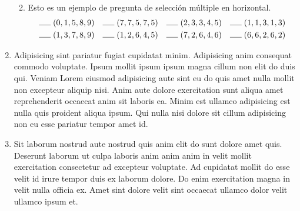 \documentclass[12pt]{article}
\newcommand{\linetomark}{\rule{0.5cm}{0.4pt}  \hspace{1mm}}
\begin{document}
\begin{enumerate}[label=\arabic*)]
\begin{enumerate}[label=1.\arabic*)]
\begin{enumerate}[label=\alph*.]
        \end{enumerate}
        \item Esto es un ejemplo de pregunta de selección múltiple en horizontal.
        \begin{align*}
            \linetomark (0,1,5,8,9) &&\linetomark (7,7,5,7,5) && \linetomark (2,3,3,4,5) && \linetomark (1,1,3,1,3)\\
            \linetomark (1,3,7,8,9) && \linetomark (1,2,6,4,5) && \linetomark (7,2,6,4, 6) &&\linetomark (6,6,2,6,2)
        \end{align*}
    \end{enumerate}
    \item Adipisicing sint pariatur fugiat cupidatat minim. Adipisicing anim consequat commodo voluptate. Ipsum mollit ipsum ipsum magna cillum non elit do duis qui. Veniam Lorem eiusmod adipisicing aute sint eu do quis amet nulla mollit non excepteur aliquip nisi. Anim aute dolore exercitation sunt aliqua amet reprehenderit occaecat anim sit laboris ea. Minim est ullamco adipisicing est nulla quis proident aliqua ipsum. Qui nulla nisi dolore sit cillum adipisicing non eu esse pariatur tempor amet id.
    \item Sit laborum nostrud aute nostrud quis anim elit do sunt dolore amet quis. Deserunt laborum ut culpa laboris anim anim anim in velit mollit exercitation consectetur ad excepteur voluptate. Ad cupidatat mollit do esse velit id irure tempor duis ex laborum dolore. Do enim exercitation magna in velit nulla officia ex. Amet sint dolore velit sint occaecat ullamco dolor velit ullamco ipsum et.
\end{enumerate}
\end{document}
